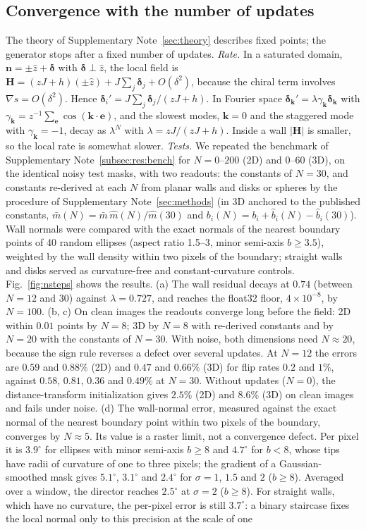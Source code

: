 \documentclass[11pt,a4paper]{article}
\begin{document}
\subsection{Convergence with the number of updates}\label{subsec:res:nsteps}
The theory of Supplementary Note~\ref{sec:theory} describes fixed points; the generator stops after a fixed number of updates. \emph{Rate.} In a saturated domain, $\bm n=\pm\hat z+\bm\delta$ with $\bm\delta\perp\hat z$, the local field is $\bm H=(zJ+h)(\pm\hat z)+J\sum_j\bm\delta_j+O(\delta^2)$, because the chiral term involves $\nabla s=O(\delta^2)$. Hence $\bm\delta_i'=J\sum_j\bm\delta_j/(zJ+h)$. In Fourier space $\bm\delta_{\bm k}'=\lambda\gamma_{\bm k}\bm\delta_{\bm k}$ with $\gamma_{\bm k}=z^{-1}\sum_{\bm e}\cos(\bm k\cdot\bm e)$, and the slowest modes, $\bm k=0$ and the staggered mode with $\gamma_{\bm k}=-1$, decay as $\lambda^N$ with $\lambda=zJ/(zJ+h)$. Inside a wall $|\bm H|$ is smaller, so the local rate is somewhat slower. \emph{Tests.} We repeated the benchmark of Supplementary Note~\ref{subsec:res:bench} for $N=0$--$200$ (2D) and $0$--$60$ (3D), on the identical noisy test masks, with two readouts: the constants of $N=30$, and constants re-derived at each $N$ from planar walls and disks or spheres by the procedure of Supplementary Note~\ref{sec:methods} (in 3D anchored to the published constants, $\bar m(N)=\bar m\,\hat m(N)/\hat m(30)$ and $b_i(N)=b_i+\hat b_i(N)-\hat b_i(30)$). Wall normals were compared with the exact normals of the nearest boundary points of 40 random ellipses (aspect ratio 1.5--3, minor semi-axis $b\ge3.5$), weighted by the wall density within two pixels of the boundary; straight walls and disks served as curvature-free and constant-curvature controls. Fig.~\ref{fig:nsteps} shows the results. (a) The wall residual decays at $0.74$ (between $N=12$ and $30$) against $\lambda=0.727$, and reaches the float32 floor, $4\times10^{-8}$, by $N=100$. (b, c) On clean images the readouts converge long before the field: 2D within $0.01$ points by $N=8$; 3D by $N=8$ with re-derived constants and by $N=20$ with the constants of $N=30$. With noise, both dimensions need $N\approx20$, because the sign rule reverses a defect over several updates. At $N=12$ the errors are $0.59$ and $0.88\%$ (2D) and $0.47$ and $0.66\%$ (3D) for flip rates $0.2$ and $1\%$, against $0.58$, $0.81$, $0.36$ and $0.49\%$ at $N=30$. Without updates ($N=0$), the distance-transform initialization gives $2.5\%$ (2D) and $8.6\%$ (3D) on clean images and fails under noise. (d) The wall-normal error, measured against the exact normal of the nearest boundary point within two pixels of the boundary, converges by $N\approx5$. Its value is a raster limit, not a convergence defect. Per pixel it is $3.9^\circ$ for ellipses with minor semi-axis $b\ge8$ and $4.7^\circ$ for $b<8$, whose tips have radii of curvature of one to three pixels; the gradient of a Gaussian-smoothed mask gives $5.1^\circ$, $3.1^\circ$ and $2.4^\circ$ for $\sigma=1$, $1.5$ and $2$ ($b\ge8$). Averaged over a window, the director reaches $2.5^\circ$ at $\sigma=2$ ($b\ge8$). For straight walls, which have no curvature, the per-pixel error is still $3.7^\circ$: a binary staircase fixes the local normal only to this precision at the scale of one 
\end{document}
